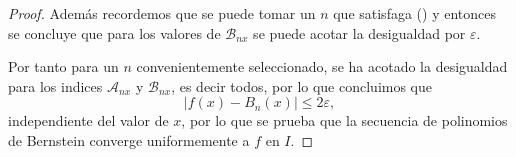 \begin{proof}
    Además recordemos que se puede tomar un  $n$ que satisfaga () y entonces se concluye que para los valores de
    $\mathcal{B}_{n x}$ se puede acotar la desigualdad por $\varepsilon$. 
    
    Por tanto para un $n$ convenientemente seleccionado, se ha acotado la desigualdad para los  indices $\mathcal{A}_{n x}$ y $\mathcal{B}_{n x}$, es decir todos, por lo que concluimos que 
    \begin{equation*}
        |f(x) - B_n(x)| \leq 2 \varepsilon,
    \end{equation*}
    independiente del valor de $x$, por lo que se prueba que la secuencia de polinomios de Bernstein converge uniformemente a $f$ en $I$.
\end{proof}